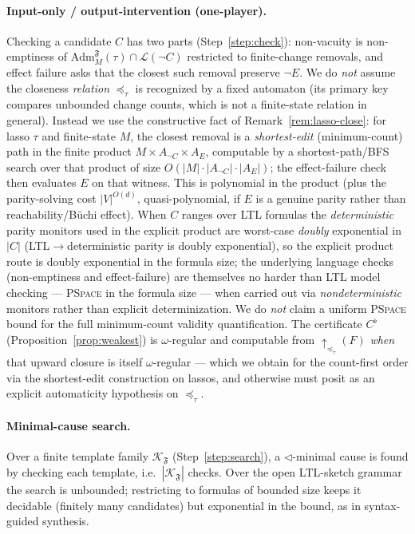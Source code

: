 \documentclass[11pt]{article}
\theoremstyle{remark}
\newcommand{\Lang}{\mathcal{L}}
\newcommand{\Frame}{\mathfrak{F}}
\newcommand{\Adm}{\mathrm{Adm}}
\begin{document}
\paragraph{Input-only / output-intervention (one-player).} Checking a candidate
\(C\) has two parts (Step~\ref{step:check}): non-vacuity is non-emptiness of
\(\Adm_M^{\Frame}(\tau)\cap\Lang(\neg C)\) restricted to finite-change removals,
and effect failure asks that the closest such removal preserve \(\neg E\). We do
\emph{not} assume the closeness \emph{relation} \(\preceq_\tau\) is recognized by
a fixed automaton (its primary key compares unbounded change counts, which is not
a finite-state relation in general). Instead we use the constructive fact of
Remark~\ref{rem:lasso-close}: for lasso \(\tau\) and finite-state \(M\), the
closest removal is a \emph{shortest-edit} (minimum-count) path in the finite
product \(M\times A_{\neg C}\times A_E\), computable by a shortest-path/BFS search
over that product of size \(O(|M|\cdot|A_{\neg C}|\cdot|A_E|)\); the effect-failure
check then evaluates \(E\) on that witness. This is polynomial in the product
(plus the parity-solving cost \(|V|^{O(d)}\), quasi-polynomial, if \(E\) is a
genuine parity rather than reachability/B\"uchi effect). When \(C\) ranges over
LTL formulas the \emph{deterministic} parity monitors used in the explicit product
are worst-case \emph{doubly} exponential in \(|C|\) (LTL${}\to{}$deterministic
parity is doubly exponential), so the explicit product route is doubly exponential
in the formula size; the underlying language checks (non-emptiness and
effect-failure) are themselves no harder than LTL model checking ---
\textsc{PSpace} in the formula size --- when carried out via \emph{nondeterministic}
monitors rather than explicit determinization. We do \emph{not} claim a uniform
\textsc{PSpace} bound for the full minimum-count validity quantification. The certificate
\(C^{\flat}\) (Proposition~\ref{prop:weakest}) is \(\omega\)-regular and
computable from \(\uparrow_{\preceq_\tau}(F)\) \emph{when} that upward closure is
itself \(\omega\)-regular --- which we obtain for the count-first order via the
shortest-edit construction on lassos, and otherwise must posit as an explicit
automaticity hypothesis on \(\preceq_\tau\).

\paragraph{Minimal-cause search.} Over a finite template family
\(\mathcal{K}_{\Frame}\) (Step~\ref{step:search}), a \(\triangleleft\)-minimal
cause is found by checking each template, i.e.\ \(|\mathcal{K}_{\Frame}|\) checks.
Over the open LTL-sketch grammar the search is unbounded; restricting to formulas
of bounded size keeps it decidable (finitely many candidates) but exponential in
the bound, as in syntax-guided synthesis.
\end{document}

